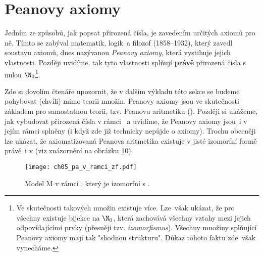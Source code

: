 \section{Peanovy axiomy}\label{sec:peanovy_axiomy}
Jedním ze způsobů, jak popsat přirozená čísla, je zavedením určitých axiomů pro ně. Tímto se zabýval matematik, logik~a filozof  (1858--1932), který zavedl soustavu axiomů, dnes nazývanou \emph{Peanovy axiomy}, která vystihuje jejich vlastnosti. Později uvidíme, tak tyto vlastnosti splňují \textbf{právě} přirozená čísla s nulou $\N_0$\footnote{Ve skutečnosti takových množin existuje více. Lze~však ukázat, že pro všechny existuje bijekce na $\N_0$, která zachovává všechny vztahy mezi jejich odpovídajícími prvky (přesněji tzv. \emph{izomorfismus}). Všechny množiny splňující Peanovy axiomy mají tak "shodnou strukturu". Důkaz tohoto faktu zde~však vynecháme.}.\par
Zde si dovolím čtenáře upozornit, že v dalším výkladu této sekce se budeme pohybovat (chvíli) mimo teorii množin. Peanovy axiomy jsou ve skutečnosti základem pro samostatnou teorii, tzv. Peanovu aritmetiku (\PA). Později si ukážeme, jak vybudovat přirozená čísla v rámci \ZF{}~a uvidíme, že Peanovy axiomy jsou~i v jejím rámci splněny (i když zde již technicky nepůjde o axiomy). Trochu obecněji lze ukázat, že axiomatizovaná Peanova aritmetika existuje v jisté izomorfní formě právě~i v \ZF{} (viz znázornění na obrázku \ref{fig:pa_v_ramci_zf}0).
\begin{figure}[H]
    \centering
    \texttt{[image: ch05\_pa\_v\_ramci\_zf.pdf]}
    \caption{Model \textsf{M} v rámci \ZF{}, který je izomorfní s \PA.}
    \label{fig:pa_v_ramci_zf}
\end{figure}
\medskip

